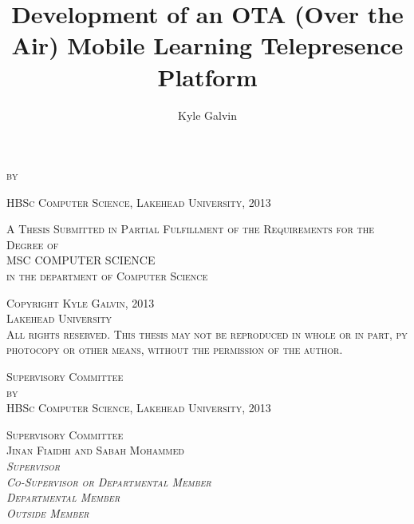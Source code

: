 \documentclass[a4paper,12pt]{report}
\begin{document}
\begin{titlepage}
	\begin{center}
	\title{\Large Development of an OTA (Over the Air) Mobile Learning Telepresence Platform}
	\thetitle{\\}
	\textsc{\normalsize by\\}
	\author{\normalsize Kyle Galvin}
	\theauthor{\\}
	\normalsize\textsc{HBSc Computer Science, Lakehead University, 2013\\[0.5cm]}
	
	\textsc{A Thesis Submitted in Partial Fulfillment of the Requirements for the Degree of\\[0.5cm]}
	\textsc{MSC COMPUTER SCIENCE\\}
	\textsc{in the department of Computer Science\\[11.5cm]}




	\textsc{Copyright Kyle Galvin, 2013\\}
	\textsc{Lakehead University\\[0.5cm]}
	\textsc{All rights reserved. This thesis may not be reproduced in whole or in part, py photocopy or other means, without the permission of the author.}
	\end{center}
\end{titlepage}
\newpage
	\begin{center}
		\textsc{\LARGE Supervisory Committee\\[2cm]}
		\thetitle{\\}
		\textsc{\normalsize by\\}
		\theauthor{\\}
		\normalsize\textsc{HBSc Computer Science, Lakehead University, 2013\\[10cm]}
	\end{center}
	\textsc{\Large Supervisory Committee\\[0.5cm]}
	\textsc{Jinan Fiaidhi and Sabah Mohammed\\}
	\textsc{\emph{Supervisor}\\}
	\textsc{\emph{Co-Supervisor or Departmental Member}\\}
	\textsc{\emph{Departmental Member}\\}
	\textsc{\emph{Outside Member}\\}
\newpage

\tableofcontents
\end{document}
